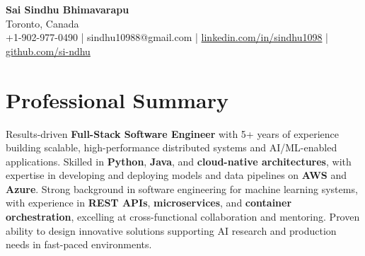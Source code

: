 \documentclass[letterpaper,11pt]{article}
\begin{document}
\begin{center}
  {\Large \textbf{Sai Sindhu Bhimavarapu}} \\
  Toronto, Canada \\
  +1-902-977-0490 \enspace | \enspace sindhu10988@gmail.com \enspace | \enspace \href{https://www.linkedin.com/in/sindhu1098/}{linkedin.com/in/sindhu1098} \enspace | \enspace \href{https://github.com/si-ndhu}{github.com/si-ndhu}
\end{center}

\section{Professional Summary}
  \begin{itemize}[leftmargin=0.15in, label={}]
    \small{\item{
     Results-driven \textbf{Full-Stack Software Engineer} with 5+ years of experience building scalable, high-performance distributed systems and AI/ML-enabled applications. Skilled in \textbf{Python}, \textbf{Java}, and \textbf{cloud-native architectures}, with expertise in developing and deploying models and data pipelines on \textbf{AWS} and \textbf{Azure}. Strong background in software engineering for machine learning systems, with experience in \textbf{REST APIs}, \textbf{microservices}, and \textbf{container orchestration}, excelling at cross-functional collaboration and mentoring. Proven ability to design innovative solutions supporting AI research and production needs in fast-paced environments.
    }}
  \end{itemize}
\vspace{-16pt}

\end{document}
